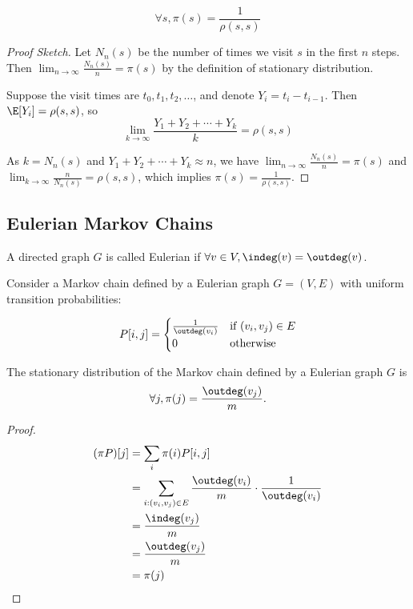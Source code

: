 \begin{lemma}
	\[ \forall s, \pi(s) = \frac{1}{\rho(s,s)} \]
\end{lemma}
\begin{proof}[Proof Sketch]
	Let $N_n(s)$ be the number of times we visit $s$ in the first $n$ steps. Then $\lim_{n \to \infty} \frac{N_n(s)}{n} = \pi(s)$ by the definition of stationary distribution.

	Suppose the visit times are $t_0, t_1, t_2, \ldots$, and denote $Y_i = t_i - t_{i-1}$.
	Then $\E[Y_i] = \rho(s,s)$, so
	\[\lim_{k\to\infty}\frac{Y_1+Y_2+\cdots+Y_k}{k} = \rho(s,s)\]

	As $k = N_n(s)$ and $Y_1 + Y_2 + \cdots + Y_k \approx n$, we have $\lim_{n \to \infty} \frac{N_n(s)}{n} = \pi(s)$ and $\lim_{k\to\infty}\frac{n}{N_n(s)} = \rho(s,s)$, which implies $\pi(s) = \frac{1}{\rho(s,s)}$.
\end{proof}

\subsection{Eulerian Markov Chains}

\begin{definition}
	A directed graph $G$ is called Eulerian if $\forall v \in V, \indeg(v) = \outdeg(v)$.
\end{definition}

Consider a Markov chain defined by a Eulerian graph $G=(V,E)$ with uniform transition probabilities:

\[P[i,j] = \begin{cases}
		\frac{1}{\outdeg(v_i)} & \text{if } (v_i, v_j) \in E \\
		0                      & \text{otherwise}
	\end{cases}\]

\begin{lemma}
	The stationary distribution of the Markov chain defined by a Eulerian graph $G$ is
	\[\forall j, \pi(j) = \frac{\outdeg(v_j)}{m}.\]
\end{lemma}
\begin{proof}
	\begin{align*}
		(\pi P)[j] & = \sum_i \pi(i) P[i,j]                                                           \\
		           & = \sum_{i: (v_i, v_j) \in E} \frac{\outdeg(v_i)}{m} \cdot \frac{1}{\outdeg(v_i)} \\
		           & = \frac{\indeg(v_j)}{m}                                                          \\
		           & = \frac{\outdeg(v_j)}{m}                                                         \\
		           & = \pi(j)
	\end{align*}
\end{proof}

